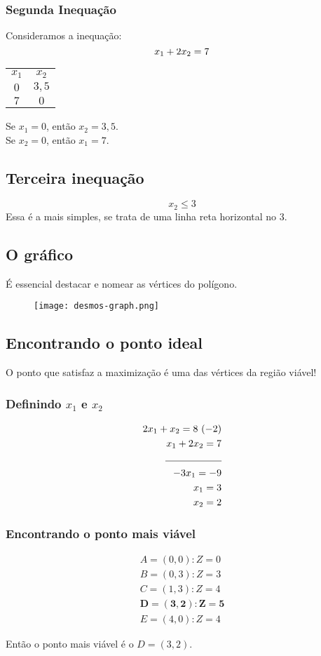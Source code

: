 \documentclass{article}
\begin{document}
\subsubsection{Segunda Inequação}

Consideramos a inequação:
\begin{equation}
    x_1 + 2x_2 = 7 \\    
\end{equation}
\begin{table}[h]
    \centering
    \begin{tabular}{c|c}
        $x_1$ & $x_2$ \\
        $0$ & $3,5$ \\
        $7$ & $0$
    \end{tabular}
\end{table}
Se $x_1 = 0$, então $x_2 = 3,5$. \\
Se $x_2 = 0$, então $x_1 = 7$.

\subsection{Terceira inequação}
\begin{equation}
    x_2 \leq 3
\end{equation}
Essa é a mais simples, se trata de uma linha reta horizontal no 3.
\subsection{O gráfico}
É essencial destacar e nomear as vértices do polígono.
\begin{figure}[h]
    \centering
    \texttt{[image: desmos-graph.png]}
\end{figure}

\subsection{Encontrando o ponto ideal}
\begin{tcolorbox}[colback=yellow!10, colframe=red!50!black, title=Importante!]
O ponto que satisfaz a maximização é uma das vértices da região viável!
\end{tcolorbox}

\subsubsection{Definindo $x_1$ e $x_2$}
\begin{align}
    2x_1 + x_2 = 8 \ (-2) \\
    x_1 + 2x_2 = 7 \\
    \rule{2cm}{0,4pt}  \\
    -3x_1 = -9 \\
    x_1 = 3 \\
    x_2 = 2
\end{align}

\subsubsection{Encontrando o ponto mais viável}
\begin{align}
    A = (0,0) : Z = 0 \\
    B = (0,3) : Z = 3 \\
    C = (1,3) : Z = 4 \\
    \mathbf{D = (3,2) : Z = 5} \\
    E = (4,0) : Z = 4
\end{align}

Então o ponto mais viável é o $D = (3,2)$.
\end{document}
